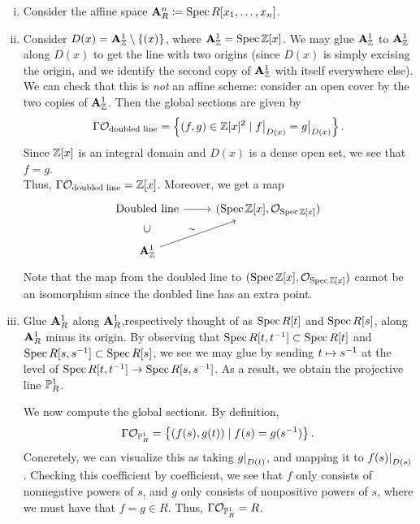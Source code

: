 \begin{enumerate}[(i)]
    \item Consider the affine space $\mathbf A_R^n \coloneq \operatorname{Spec} R[x_1, \dots, x_n]$.
    
    \item Consider $D(x) = \mathbf A_\mathbb Z^1 \setminus \{(x)\}$, where $\mathbf A_\mathbb Z^1 = \operatorname{Spec} \mathbb Z[x]$. We may glue $\mathbf A_\mathbb Z^1$ to $\mathbf A_\mathbb Z^1$ along $D(x)$ to get the line with two origins (since $D(x)$ is simply excising the origin, and we identify the second copy of $\mathbf A_\mathbb Z^1$ with itself everywhere else). We can check that this is \textit{not} an affine scheme: consider an open cover by the two copies of $\mathbf A_\mathbb Z^1$. Then the global sections are given by
    \[ \Gamma \SO_{\text{doubled line}} = \left\{(f, g) \in \ZZ[x]^2 \mid \restr{f}{D(x)} = \restr{g}{D(x)}\right\}. \]
    Since $\mathbb Z[x]$ is an integral domain and $D(x)$ is a dense open set, we see that $f = g$. \\ Thus, $\Gamma \mathcal O_{\text{doubled line}} = \mathbb Z[x]$. Moreover, we get a map
    \[ 
        \begin{tikzcd}
            \text{Doubled line} \arrow[d, phantom, sloped, "\supset"] \arrow[r] & (\Spec \ZZ[x], \SO_{\Spec \ZZ[x]}) \\
            \mbf A_\ZZ^1 \arrow[ur, "\sim"]
        \end{tikzcd}
    \]
    Note that the map from the doubled line to $(\operatorname{Spec} \mathbb Z[x], \mathcal O_{\operatorname{Spec} \mathbb Z[x]})$ cannot be an isomorphism since the doubled line has an extra point.

    \item Glue $\mathbf A_R^1$ along $\mathbf A_R^1$,respectively thought of as $\operatorname{Spec} R[t]$ and $\operatorname{Spec} R[s]$, along $\mathbf A_R^1$ minus its origin. By observing that $\operatorname{Spec} R[t, t^{-1}] \subset \operatorname{Spec} R[t]$ and $\operatorname{Spec} R[s, s^{-1}] \subset \operatorname{Spec} R[s]$, we see we may glue by sending $t \mapsto s^{-1}$ at the level of $\operatorname{Spec} R[t, t^{-1}] \to \operatorname{Spec} R[s, s^{-1}]$. As a result, we obtain the projective line $\mathbb P_R^1$.
    
    We now compute the global sections. By definition,
    \[ \Gamma \mathcal O_{\mathbb P_R^1} = \left\{ (f(s), g(t)) \mid f(s) = g(s^{-1})\right\}. \]
    Concretely, we can visualize this as taking $\restr{g}{D(t)}$, and mapping it to $\restr{f(s)}{D(s)}$. Checking this coefficient by coefficient, we see that $f$ only consists of nonnegative powers of $s$, and $g$ only consists of nonpositive powers of $s$, where we must have that $f = g \in R$. Thus, $\Gamma \mathcal O_{\mathbb P_R^1} = R$.
\end{enumerate}

